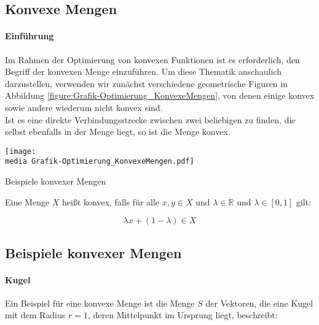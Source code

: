 \subsection{Konvexe Mengen}

\paragraph{Einführung}

Im Rahmen der Optimierung von konvexen Funktionen ist es erforderlich, den Begriff der konvexen Menge einzuführen. Um diese Thematik anschaulich darzustellen, verwenden wir zunächst verschiedene geometrische Figuren in Abbildung \ref{figure:Grafik-Optimierung_KonvexeMengen}, von denen einige konvex sowie andere wiederum nicht konvex sind. \\
Ist es eine direkte Verbindungsstrecke zwischen zwei beliebigen zu finden, die selbst ebenfalls in der Menge liegt, so ist die Menge konvex.

\begin{dsafigure}
\begin{center}
\texttt{[image: \\media Grafik-Optimierung\_KonvexeMengen.pdf]}
\label{figure:Grafik-Optimierung_KonvexeMengen}
\caption{Beispiele konvexer Mengen}
\end{center}
\end{dsafigure}

\begin{Def}

Eine Menge $X$ heißt konvex, falls für alle $x, y \in X$ und $\lambda \in \mathbb{R}$ und $\lambda \in [0,1]$ gilt:

\begin{equation*}
\lambda x + (1 - \lambda) \in X
\end{equation*}

\end{Def}

\subsection{Beispiele konvexer Mengen}

\paragraph{Kugel}

Ein Beispiel für eine konvexe Menge ist die Menge $S$ der Vektoren, die eine Kugel mit dem Radius $r = 1$, deren Mittelpunkt im Ursprung liegt, beschreibt:

